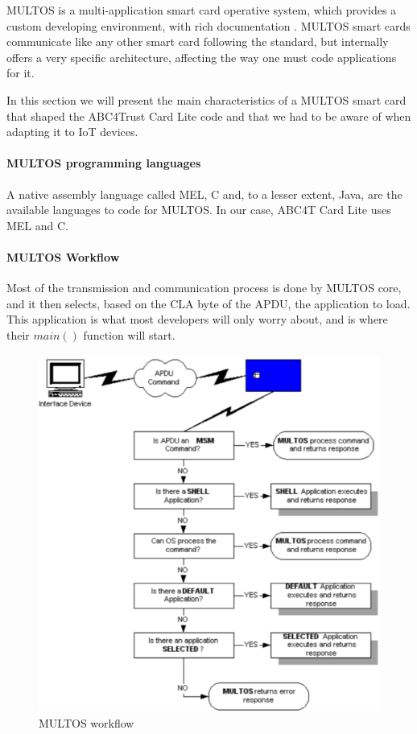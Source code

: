 MULTOS is a multi-application smart card operative system, which provides a custom developing environment, with rich documentation \citep{MultosTechLib}. MULTOS smart cards communicate like any other smart card following the standard, but internally offers a very specific architecture, affecting the way one must code applications for it.

In this section we will present the main characteristics of a MULTOS smart card that shaped the ABC4Trust Card Lite code and that we had to be aware of when adapting it to IoT devices.

\paragraph{MULTOS programming languages} A native assembly language called MEL, C and, to a lesser extent, Java, are the available languages to code for MULTOS. In our case, ABC4T Card Lite uses MEL and C.

\paragraph{MULTOS Workflow}

Most of the transmission and communication process is done by MULTOS core, and it then selects, based on the CLA byte of the APDU, the application to load. This application is what most developers will only worry about, and is where their $main()$ function will start.

\begin{figure}[bth]
	\begin{center}
		\includegraphics[width=\linewidth]{gfx/multosWorkflow}
	\end{center}
	\caption{MULTOS workflow}
	\label{fig:multosWorkflow}
\end{figure}

